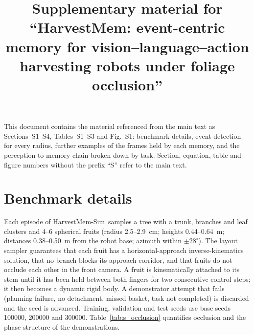 \documentclass[preprint,12pt,authoryear]{elsarticle}
\newcommand{\bench}{HarvestMem-Sim}
\begin{document}
\begin{frontmatter}
\title{Supplementary material for ``HarvestMem: event-centric memory for vision--\hspace{0pt}language--\hspace{0pt}action harvesting robots under foliage occlusion''}
\end{frontmatter}

This document contains the material referenced from the main text as Sections~S1--S4, Tables~S1--S3 and Fig.~S1: benchmark details, event detection for every radius, further examples of the frames held by each memory, and the perception-to-memory chain broken down by task. Section, equation, table and figure numbers without the prefix ``S'' refer to the main text.

\section{Benchmark details}
\label{sec:s_benchmark}
Each episode of \bench\ samples a tree with a trunk, branches and leaf clusters and 4--6 spherical fruits (radius 2.5--2.9~cm; heights 0.44--0.64~m; distances 0.38--0.50~m from the robot base; azimuth within $\pm 28^\circ$). The layout sampler guarantees that each fruit has a horizontal-approach inverse-kinematics solution, that no branch blocks its approach corridor, and that fruits do not occlude each other in the front camera. A fruit is kinematically attached to its stem until it has been held between both fingers for two consecutive control steps; it then becomes a dynamic rigid body. A demonstrator attempt that fails (planning failure, no detachment, missed basket, task not completed) is discarded and the seed is advanced. Training, validation and test seeds use base seeds 100000, 200000 and 300000. Table~\ref{tab:s_occlusion} quantifies occlusion and the phase structure of the demonstrations.
\end{document}
